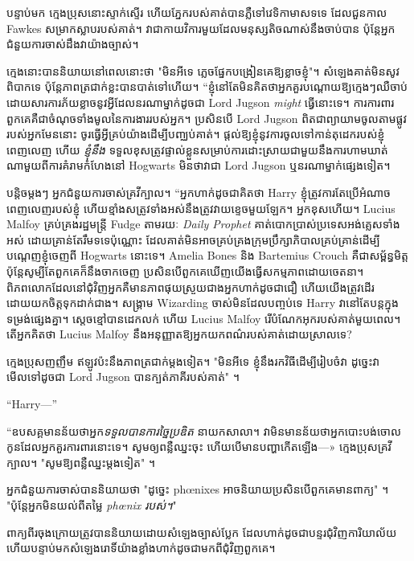 បន្ទាប់មក ក្មេងប្រុសនោះស្ទាក់ស្ទើរ ហើយភ្នែករបស់គាត់បានភ្លឺទៅវេទិកាមាសទទេ ដែលជួនកាល Fawkes សម្រាកស្លាបរបស់គាត់។ វា​ជា​កាយវិការ​មួយ​ដែល​មនុស្ស​តិច​ណាស់​នឹង​ចាប់​បាន ប៉ុន្តែ​អ្នក​ជំនួយការ​ចាស់​ដឹង​វា​យ៉ាង​ច្បាស់។

ក្មេងនោះបាននិយាយនៅពេលនោះថា "មិនអីទេ ភ្លេចផ្នែកបង្រៀនគេឱ្យខ្លាចខ្ញុំ"។ សំឡេង​គាត់​មិន​សូវ​ពិបាក​ទេ ប៉ុន្តែ​ភាព​ត្រជាក់​ខ្លះ​បាន​បាត់​ទៅ​ហើយ។ “ខ្ញុំនៅតែមិនគិតថាអ្នកគួរបណ្តោយឱ្យក្មេងៗឈឺចាប់ដោយសារការភ័យខ្លាចនូវអ្វីដែលនរណាម្នាក់ដូចជា Lord Jugson \emph{might} ធ្វើនោះទេ។ ការការពារពួកគេគឺជាចំណុចទាំងមូលនៃការងាររបស់អ្នក។ ប្រសិនបើ Lord Jugson ពិតជាព្យាយាមចូលតាមផ្លូវរបស់អ្នកមែននោះ ចូរធ្វើអ្វីគ្រប់យ៉ាងដើម្បីបញ្ឈប់គាត់។ ផ្តល់ឱ្យខ្ញុំនូវការចូលទៅកាន់តុដេករបស់ខ្ញុំពេញលេញ ហើយ \emph{ខ្ញុំនឹង} ទទួលខុសត្រូវផ្ទាល់ខ្លួនសម្រាប់ការដោះស្រាយជាមួយនឹងការហាមឃាត់ណាមួយពីការគំរាមកំហែងនៅ Hogwarts មិនថាវាជា Lord Jugson ឬនរណាម្នាក់ផ្សេងទៀត។

បន្តិចម្ដងៗ អ្នកជំនួយការចាស់គ្រវីក្បាល។ “អ្នក​ហាក់​ដូចជា​គិត​ថា Harry ខ្ញុំ​ត្រូវ​ការ​តែ​ប្រើ​អំណាច​ពេញ​លេញ​របស់​ខ្ញុំ ហើយ​ខ្មាំង​សត្រូវ​ទាំង​អស់​នឹង​ត្រូវ​វាយ​ខ្ទេច​មួយ​ឡែក។ អ្នកខុសហើយ។ Lucius Malfoy គ្រប់គ្រងរដ្ឋមន្ត្រី Fudge តាមរយៈ \emph{Daily Prophet} គាត់បោកប្រាស់ប្រទេសអង់គ្លេសទាំងអស់ ដោយគ្រាន់តែរឹមទទេប៉ុណ្ណោះ ដែលគាត់មិនអាចគ្រប់គ្រងក្រុមប្រឹក្សាភិបាលគ្រប់គ្រាន់ដើម្បីបណ្តេញខ្ញុំចេញពី Hogwarts នោះទេ។ Amelia Bones និង Bartemius Crouch គឺជាសម្ព័ន្ធមិត្ត ប៉ុន្តែសូម្បីតែពួកគេក៏នឹងចាកចេញ ប្រសិនបើពួកគេឃើញយើងធ្វើសកម្មភាពដោយចេតនា។ ពិភពលោកដែលនៅជុំវិញអ្នកគឺមានភាពផុយស្រួយជាងអ្នកហាក់ដូចជាជឿ ហើយយើងត្រូវដើរដោយយកចិត្តទុកដាក់ជាង។ សង្គ្រាម Wizarding ចាស់មិនដែលបញ្ចប់ទេ Harry វានៅតែបន្តក្នុងទម្រង់ផ្សេងគ្នា។ ស្តេចខ្មៅបានដេកលក់ ហើយ Lucius Malfoy រើបំណែកអុករបស់គាត់មួយពេល។ តើ​អ្នក​គិត​ថា Lucius Malfoy នឹង​អនុញ្ញាត​ឱ្យ​អ្នក​យក​ពណ៌​របស់​គាត់​ដោយ​ស្រាល​ទេ?

ក្មេង​ប្រុស​ញញឹម ឥឡូវ​ប៉ះ​នឹង​ភាព​ត្រជាក់​ម្ដង​ទៀត។ "មិនអីទេ ខ្ញុំនឹងរកវិធីដើម្បីរៀបចំវា ដូច្នេះវាមើលទៅដូចជា Lord Jugson បានក្បត់ភាគីរបស់គាត់" ។

“Harry—”

“ឧបសគ្គមានន័យថាអ្នក\emph{ទទួលបានការច្នៃប្រឌិត} នាយកសាលា។ វាមិនមានន័យថាអ្នកបោះបង់ចោលកូនដែលអ្នកគួរការពារនោះទេ។ សូម​ឲ្យ​ពន្លឺ​ឈ្នះ​ចុះ ហើយ​បើ​មាន​បញ្ហា​កើត​ឡើង—» ក្មេង​ប្រុស​គ្រវីក្បាល។ "សូមឱ្យពន្លឺឈ្នះម្តងទៀត" ។

អ្នកជំនួយការចាស់បាននិយាយថា "ដូច្នេះ phœnixes អាចនិយាយប្រសិនបើពួកគេមានពាក្យ" ។ "ប៉ុន្តែអ្នកមិនយល់ពីតម្លៃ \emph{phœnix របស់។}"

ពាក្យពីរចុងក្រោយត្រូវបាននិយាយដោយសំឡេងច្បាស់ប្លែក ដែលហាក់ដូចជាបន្ទរជុំវិញការិយាល័យ ហើយបន្ទាប់មកសំឡេងរោទិ៍យ៉ាងខ្លាំងហាក់ដូចជាមកពីជុំវិញពួកគេ។

